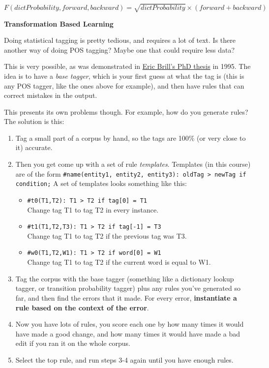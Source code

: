 \begin{description}
  \[
    F(dictProbability, forward, backward) = \sqrt{dictProbability} \times 
      (forward + backward)
  \]

  \item \textbf{Transformation Based Learning}\\
  \label{brill-rules}


  Doing statistical tagging is pretty tedious, and requires a lot of text. Is
  there another way of doing POS tagging? Maybe one that could require less
  data?

  This is very possible, as was demonstrated in
  \href{http://dl.acm.org/citation.cfm?doid=974499.974526}{Eric Brill's PhD
  thesis} in 1995. The idea is to have a \textit{base tagger}, which is your 
  first guess at what the tag is (this is any POS tagger, like the ones above 
  for example), and then have rules that can correct mistakes in the output.

  This presents its own problems though. For example, how do you generate 
  rules? The solution is this:

  \begin{enumerate}
    \item Tag a small part of a corpus by hand, so the tags are 100\% (or very 
    close to it) accurate.
    \item Then you get come up with a set of rule \textit{templates}. Templates 
    (in this course) are of the form
    \texttt{\#name(entity1, entity2, entity3): oldTag > newTag if condition;} A 
    set of templates looks something like this:
    \begin{itemize}
      \item \texttt{\#t0(T1,T2): T1 > T2 if tag[0] = T1}\\
        Change tag T1 to tag T2 in every instance.
      \item \texttt{\#t1(T1,T2,T3): T1 > T2 if tag[-1] = T3}\\
        Change tag T1 to tag T2 if the previous tag was T3.
      \item \texttt{\#w0(T1,T2,W1): T1 > T2 if word[0] = W1}\\
        Change tag T1 to tag T2 if the current word is equal to W1.
    \end{itemize}
    \item Tag the corpus with the base tagger (something like a dictionary 
    lookup tagger, or transition probability tagger) plus any rules you've 
    generated so far, and then find the errors that it made. For every error,
    \textbf{instantiate a rule based on the context of the error}.
    \item Now you have lots of rules, you score each one by how many times it 
    would have made a good change, and how many times it would have made a bad 
    edit if you ran it on the whole corpus.
    \item Select the top rule, and run steps 3-4 again until you have enough 
    rules.
  \end{enumerate}


\end{description}
